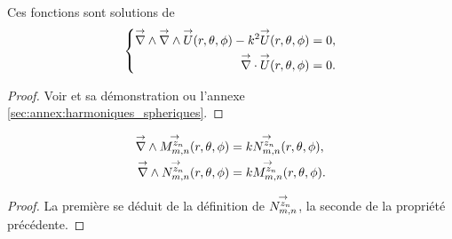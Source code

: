     \begin{prop}
        Ces fonctions sont solutions de 
        \begin{equation*}
            \left\lbrace
                \begin{aligned}
                    \vrot \vrot \vect{U}(\rtp) - k^2 \vect{U}(\rtp) &= 0,
                    \\
                    \vdiv \vect{U}(\rtp) &= 0.
                \end{aligned}
            \right.
        \end{equation*}
    \end{prop}
    \begin{proof}
        Voir \cite[Théorème.~5.3.1]{nedelec_acoustic_2001} et sa démonstration ou l'annexe \ref{sec:annex:harmoniques_spheriques}.
    \end{proof}

    \begin{prop}
        \label{prop:Mmn_Nmn_rot}
        \begin{align*}
            \vrot \Mmn[z_n](\rtp) &= k\Nmn[z_n](\rtp),
            \\
            \vrot \Nmn[z_n](\rtp) &= k\Mmn[z_n](\rtp).
        \end{align*}
    \end{prop}
    \begin{proof}
        La première se déduit de la définition de \(\Nmn[z_n]\), la seconde de la propriété précédente.
    \end{proof}



